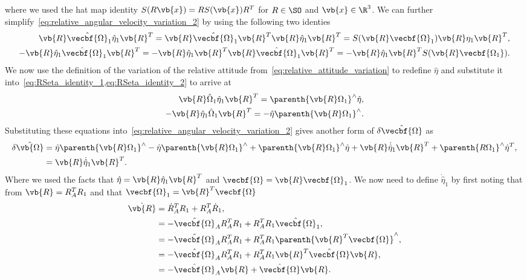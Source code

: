 \documentclass[11pt, reqno]{article}    %
\begin{document}
where we used the hat map identity \( S(R \vb{x}) = R S(\vb{x}) R^T\) for \( R \in \SO\) and \( \vb{x} \in \R^3\).
We can further simplify~\cref{eq:relative_angular_velocity_variation_2} by using the following two identies
\begin{align}
    \vb{R} \hat{\vecbf{\Omega}}_1 \hat{\eta}_1 \vb{R}^T = \vb{R}\hat{\vecbf{\Omega}}_1 \vb{R}^T \vb{R} \hat{\eta}_1 \vb{R}^T = S(\vb{R} \vecbf{\Omega}_1) \vb{R} \eta_1 \vb{R}^T , \label{eq:RSeta_identity_1}\\
    -\vb{R} \hat{\eta}_1 \hat{\vecbf{\Omega}}_1\vb{R}^T = - \vb{R} \hat{\eta}_1 \vb{R}^T \vb{R} \hat{\vecbf{\Omega}}_1\vb{R}^T = -\vb{R} \hat{\eta}_1 \vb{R}^T S(\vb{R} \vecbf{\Omega_1}) . \label{eq:RSeta_identity_2}
\end{align}
We now use the definition of the variation of the relative attitude from~\cref{eq:relative_attitude_variation} to redefine \( \hat{\eta}\) and substitute it into~\cref{eq:RSeta_identity_1,eq:RSeta_identity_2} to arrive at
\begin{align*}
    \vb{R} \hat{\Omega}_1 \hat{\eta}_1 \vb{R}^T = \parenth{\vb{R} \Omega_1}^\wedge \hat{\eta} , \\
    - \vb{R} \hat{\eta}_1 \hat{\Omega}_1 \vb{R}^T = -\hat{\eta} \parenth{\vb{R}\Omega_1}^\wedge.
\end{align*}
Substituting these equations into~\cref{eq:relative_angular_velocity_variation_2} gives another form of \( \delta \hat{\vecbf{\Omega}}\) as
\begin{align}\label{eq:relative_angular_velocity_variation_3}
    \delta \hat{\vb{\Omega}} &= \hat{\eta} \parenth{\vb{R} \Omega_1}^\wedge - \hat{\eta} \parenth{\vb{R} \Omega_1}^\wedge + \parenth{\vb{R} \Omega_1}^\wedge \hat{\eta} + \vb{R} \dot{\hat{\eta}}_1 \vb{R}^T + \parenth{R \Omega_1}^\wedge \hat{\eta}^T , \\
                             &= \vb{R} \dot{\hat{\eta}}_1 \vb{R}^T .
\end{align}
Where we used the facts that \( \hat{\eta} = \vb{R} \hat{\eta}_1 \vb{R}^T \) and \( \vecbf{\Omega} = \vb{R} \vecbf{\Omega}_1\). 
We now need to define \( \dot{\hat{\eta}}_1\) by first noting that from \( \vb{R} = R_A^T R_1\) and that \( \vecbf{\Omega}_1 = \vb{R}^T \vecbf{\Omega}\)
\begin{align}\label{eq:relR_dot}
    \dot{\vb{R}} &= \dot{R}_A^T R_1 + R_A^T \dot{R}_1 , \nonumber\\
                 &= - \hat{\vecbf{\Omega}}_A R_A^T R_1 + R_A^T R_1 \hat{\vecbf{\Omega}}_1 ,\nonumber\\
                 &= -\hat{\vecbf{\Omega}}_A R_A^T R_1 + R_A^T R_1 \parenth{\vb{R}^T \vecbf{\Omega}}^\wedge , \nonumber\\
                 &= -\hat{\vecbf{\Omega}}_A R_A^T R_1 + R_A^T R_1 \vb{R}^T \hat{\vecbf{\Omega}} \vb{R} ,\nonumber\\
                 &= -\hat{\vecbf{\Omega}}_A\vb{R} + \hat{\vecbf{\Omega}} \vb{R} .
\end{align}
\end{document}
